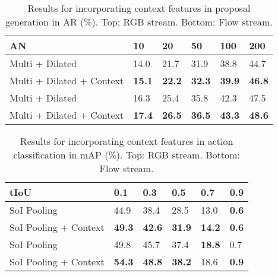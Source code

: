 \documentclass[10pt,twocolumn,letterpaper]{article}
\newcommand\Tstrut{\rule{0pt}{2.2ex}}       \newcommand\Bstrut{\rule[-1.0ex]{0pt}{0pt}} \newcommand{\TBstrut}{\Tstrut\Bstrut}
\begin{document}
\begin{table}[t]
\centering
 \small
 \setlength{\tabcolsep}{3.47pt}
 \begin{tabular}{l||C{0.62cm}C{0.62cm}C{0.62cm}C{0.62cm}C{0.62cm}}
  \hline \TBstrut
  AN                         & 10            & 20            & 50            & 100           & 200           \\
  \hline \Tstrut
  Multi + Dilated            & 14.0          & 21.7          & 31.9          & 38.8          & 44.7          \\ \Bstrut
  Multi + Dilated + Context  & \textbf{15.1} & \textbf{22.2} & \textbf{32.3} & \textbf{39.9} & \textbf{46.8} \\
  \hline
  \hline \Tstrut
  Multi + Dilated            & 16.3          & 25.4          & 35.8          & 42.3          & 47.5          \\ \Bstrut
  Multi + Dilated + Context  & \textbf{17.4} & \textbf{26.5} & \textbf{36.5} & \textbf{43.3} & \textbf{48.6} \\
  \hline
 \end{tabular}
 \vspace{-2mm}
 \caption{\small Results for incorporating context features in proposal
generation in AR (\%). Top: RGB stream. Bottom: Flow stream.}
\vspace{-1mm}
 \label{tab:context-proposal}
\end{table}

\begin{table}[t]
\centering
 \small
 \setlength{\tabcolsep}{3.47pt}
 \begin{tabular}{l||C{0.724cm}C{0.724cm}C{0.724cm}C{0.724cm}C{0.724cm}}
  \hline \TBstrut
  tIoU                   & 0.1           & 0.3           & 0.5           & 0.7           & 0.9           \\
  \hline \Tstrut
  SoI Pooling            & 44.9          & 38.4          & 28.5          & 13.0          & \textbf{0.6}  \\ \Bstrut
  SoI Pooling + Context  & \textbf{49.3} & \textbf{42.6} & \textbf{31.9} & \textbf{14.2} & \textbf{0.6}  \\
  \hline
  \hline \Tstrut
  SoI Pooling            & 49.8          & 45.7          & 37.4          & \textbf{18.8} & 0.7           \\ \Bstrut
  SoI Pooling + Context  & \textbf{54.3} & \textbf{48.8} & \textbf{38.2} & 18.6          & \textbf{0.9}  \\
  \hline
 \end{tabular}
 \vspace{-2mm}
 \caption{\small Results for incorporating context features in action
classification in mAP (\%). Top: RGB stream. Bottom: Flow stream.}
\vspace{-1mm}
 \label{tab:context-localize}
\end{table}
\end{document}
